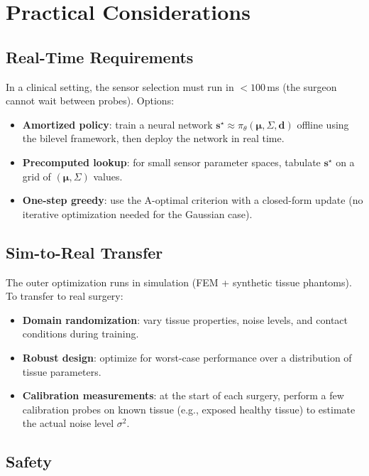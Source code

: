 \documentclass[11pt,a4paper]{article}
\theoremstyle{definition}
\begin{document}
\section{Practical Considerations}

\subsection{Real-Time Requirements}

In a clinical setting, the sensor selection must run in $< 100$\,ms (the surgeon cannot wait between probes).  Options:
\begin{itemize}[nosep]
  \item \textbf{Amortized policy}: train a neural network $\bm{s}^\star \approx \pi_\theta(\bm{\mu}, \Sigma, \bm{d})$ offline using the bilevel framework, then deploy the network in real time.
  \item \textbf{Precomputed lookup}: for small sensor parameter spaces, tabulate $\bm{s}^\star$ on a grid of $(\bm{\mu}, \Sigma)$ values.
  \item \textbf{One-step greedy}: use the A-optimal criterion with a closed-form update (no iterative optimization needed for the Gaussian case).
\end{itemize}

\subsection{Sim-to-Real Transfer}

The outer optimization runs in simulation (FEM + synthetic tissue phantoms).  To transfer to real surgery:
\begin{itemize}[nosep]
  \item \textbf{Domain randomization}: vary tissue properties, noise levels, and contact conditions during training.
  \item \textbf{Robust design}: optimize for worst-case performance over a distribution of tissue parameters.
  \item \textbf{Calibration measurements}: at the start of each surgery, perform a few calibration probes on known tissue (e.g., exposed healthy tissue) to estimate the actual noise level $\sigma^2$.
\end{itemize}

\subsection{Safety}
\end{document}
